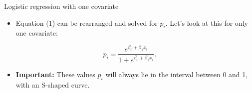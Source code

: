 \documentclass[
  10pt,
  ignorenonframetext,
]{beamer}
\providecommand{\tightlist}{%
  \setlength{\itemsep}{0pt}\setlength{\parskip}{0pt}}
\begin{document}
\begin{frame}
\begin{block}{Logistic regression with one covariate}
\protect\hypertarget{logistic-regression-with-one-covariate}{}
\vspace{2mm}

\begin{itemize}
\tightlist
\item
  Equation (1) can be rearranged and solved for \(p_i\). Let's look at
  this for only one covariate:
\end{itemize}

\[ p_i= \frac{e^{\beta_0+\beta_1 x_i}}{1 + e^{\beta_0 + \beta_1 x_i}}.\]

\vspace{2mm}

\begin{itemize}
\tightlist
\item
  \textbf{Important:} These values \(p_i\) will always lie in the
  interval between 0 and 1, with an S-shaped curve.
\end{itemize}
\end{block}
\end{frame}
\end{document}
